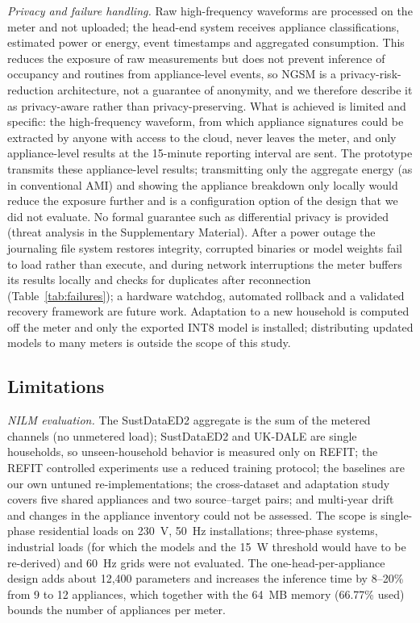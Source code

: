 \documentclass[fleqn,10pt]{wlscirep}
\begin{document}
\textit{Privacy and failure handling.} Raw high-frequency waveforms are processed on the meter and not uploaded; the head-end system receives appliance classifications, estimated power or energy, event timestamps and aggregated consumption. This reduces the exposure of raw measurements but does not prevent inference of occupancy and routines from appliance-level events, so NGSM is a privacy-risk-reduction architecture, not a guarantee of anonymity, and we therefore describe it as privacy-aware rather than privacy-preserving. What is achieved is limited and specific: the high-frequency waveform, from which appliance signatures could be extracted by anyone with access to the cloud, never leaves the meter, and only appliance-level results at the 15-minute reporting interval are sent. The prototype transmits these appliance-level results; transmitting only the aggregate energy (as in conventional AMI) and showing the appliance breakdown only locally would reduce the exposure further and is a configuration option of the design that we did not evaluate. No formal guarantee such as differential privacy is provided (threat analysis in the Supplementary Material). After a power outage the journaling file system restores integrity, corrupted binaries or model weights fail to load rather than execute, and during network interruptions the meter buffers its results locally and checks for duplicates after reconnection (Table~\ref{tab:failures}); a hardware watchdog, automated rollback and a validated recovery framework are future work. Adaptation to a new household is computed off the meter and only the exported INT8 model is installed; distributing updated models to many meters is outside the scope of this study.

\subsection{Limitations}
\label{subsec:limitations}

\textit{NILM evaluation.} The SustDataED2 aggregate is the sum of the metered channels (no unmetered load); SustDataED2 and UK-DALE are single households, so unseen-household behavior is measured only on REFIT; the REFIT controlled experiments use a reduced training protocol; the baselines are our own untuned re-implementations; the cross-dataset and adaptation study covers five shared appliances and two source--target pairs; and multi-year drift and changes in the appliance inventory could not be assessed. The scope is single-phase residential loads on 230~V, 50~Hz installations; three-phase systems, industrial loads (for which the models and the 15~W threshold would have to be re-derived) and 60~Hz grids were not evaluated. The one-head-per-appliance design adds about 12{,}400 parameters and increases the inference time by 8--20\% from 9 to 12 appliances, which together with the 64~MB memory (66.77\% used) bounds the number of appliances per meter.
\end{document}
